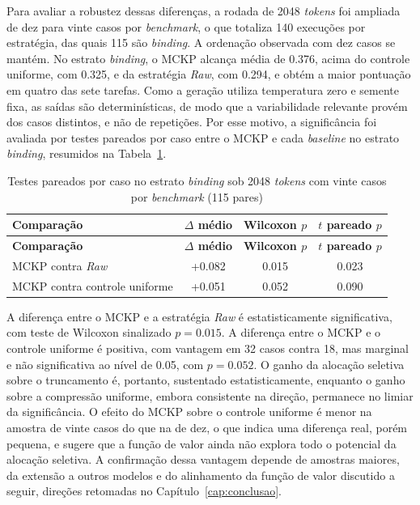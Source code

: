 Para avaliar a robustez dessas diferenças, a rodada de 2048 \textit{tokens} foi ampliada de dez para vinte casos por \textit{benchmark}, o que totaliza 140 execuções por estratégia, das quais 115 são \textit{binding}. A ordenação observada com dez casos se mantém. No estrato \textit{binding}, o MCKP alcança média de 0.376, acima do controle uniforme, com 0.325, e da estratégia \textit{Raw}, com 0.294, e obtém a maior pontuação em quatro das sete tarefas. Como a geração utiliza temperatura zero e semente fixa, as saídas são determinísticas, de modo que a variabilidade relevante provém dos casos distintos, e não de repetições. Por esse motivo, a significância foi avaliada por testes pareados por caso entre o MCKP e cada \textit{baseline} no estrato \textit{binding}, resumidos na Tabela~\ref{tab:mckp-significancia}.

{
\footnotesize
\setlength{\tabcolsep}{6pt}
\begin{longtable}{lccc}
\caption{Testes pareados por caso no estrato \textit{binding} sob 2048 \textit{tokens} com vinte casos por \textit{benchmark} (115 pares)}
\label{tab:mckp-significancia} \\
\toprule
\textbf{Comparação} & \textbf{$\Delta$ médio} & \textbf{Wilcoxon $p$} & \textbf{$t$ pareado $p$} \\
\midrule
\endfirsthead
\toprule
\textbf{Comparação} & \textbf{$\Delta$ médio} & \textbf{Wilcoxon $p$} & \textbf{$t$ pareado $p$} \\
\midrule
\endhead
\bottomrule
\endfoot
\bottomrule
\endlastfoot
MCKP contra \textit{Raw}          & +0.082 & 0.015 & 0.023 \\
MCKP contra controle uniforme     & +0.051 & 0.052 & 0.090 \\
\end{longtable}
}

A diferença entre o MCKP e a estratégia \textit{Raw} é estatisticamente significativa, com teste de Wilcoxon sinalizado $p = 0.015$. A diferença entre o MCKP e o controle uniforme é positiva, com vantagem em 32 casos contra 18, mas marginal e não significativa ao nível de 0.05, com $p = 0.052$. O ganho da alocação seletiva sobre o truncamento é, portanto, sustentado estatisticamente, enquanto o ganho sobre a compressão uniforme, embora consistente na direção, permanece no limiar da significância. O efeito do MCKP sobre o controle uniforme é menor na amostra de vinte casos do que na de dez, o que indica uma diferença real, porém pequena, e sugere que a função de valor ainda não explora todo o potencial da alocação seletiva. A confirmação dessa vantagem depende de amostras maiores, da extensão a outros modelos e do alinhamento da função de valor discutido a seguir, direções retomadas no Capítulo~\ref{cap:conclusao}.

